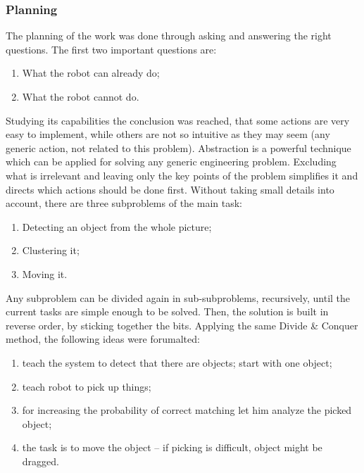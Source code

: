     \subsubsection{Planning}
        The planning of the work was done through asking and answering the right questions. The first two important questions are:
        \begin{enumerate}[topsep=2pt, partopsep=0pt,itemsep=0pt,parsep=1pt]
            \item What the robot can already do;
            \item What the robot cannot do.
        \end{enumerate}
        Studying its capabilities the conclusion was reached, that some actions are very easy to implement, while others are not so intuitive as they may seem (any generic action, not related to this problem). Abstraction is a powerful technique which can be applied for solving any generic engineering problem. Excluding what is irrelevant and leaving only the key points of the problem simplifies it and directs which actions should be done first. Without taking small details into account, there are three subproblems of the main task:
        \begin{enumerate}[topsep=2pt, partopsep=0pt,itemsep=0pt,parsep=1pt]
            \item Detecting an object from the whole picture;
            \item Clustering it;
            \item Moving it.
        \end{enumerate}
        Any subproblem can be divided again in sub-subproblems, recursively, until the current tasks are simple enough to be solved. Then, the solution is built in reverse order, by sticking together the bits. Applying the same Divide \& Conquer method, the following ideas were forumalted:
        \begin{enumerate}[topsep=2pt, partopsep=0pt,itemsep=0pt,parsep=1pt]
            \item teach the system to detect that there are objects; start with one object;
            \item teach robot to pick up things;
            \item for increasing the probability of correct matching let him analyze the picked object;
            \item the task is to move the object -- if picking is difficult, object might be dragged.
        \end{enumerate}
